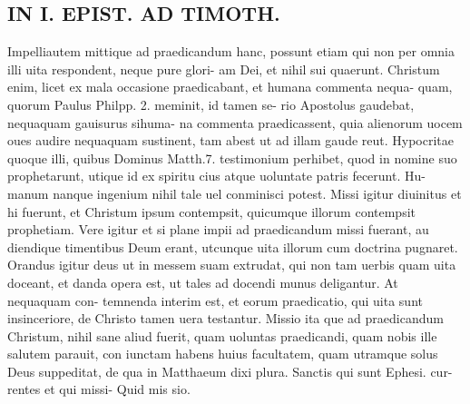 \documentclass{article}
\begin{document}
\begin{pages}
\section*{IN I. EPIST. AD TIMOTH. }\pstart Impelliautem mittique ad praedicandum hanc, possunt etiam qui non per omnia illi uita respondent, neque pure glori- am Dei, et nihil sui quaerunt. Christum enim, licet ex mala occasione praedicabant, et humana commenta nequa- quam, quorum Paulus Philpp. 2. meminit, id tamen se- rio Apostolus gaudebat, nequaquam gauisurus sihuma- na commenta praedicassent, quia alienorum uocem oues audire nequaquam sustinent, tam abest ut ad illam gaude reut. Hypocritae quoque illi, quibus Dominus Matth.7. testimonium perhibet, quod in nomine suo prophetarunt, utique id ex spiritu cius atque uoluntate patris fecerunt. Hu- manum nanque ingenium nihil tale uel conminisci potest.  Missi igitur diuinitus et hi fuerunt, et Christum ipsum contempsit, quicumque illorum contempsit prophetiam.  Vere igitur et si plane impii ad praedicandum missi fuerant, au diendique timentibus Deum erant, utcunque uita illorum cum doctrina pugnaret.   \pend\pstart Orandus igitur deus ut in messem suam extrudat, qui non tam uerbis quam uita doceant, et danda opera est, ut tales ad docendi munus deligantur. At nequaquam con- temnenda interim est, et eorum praedicatio, qui uita sunt insinceriore, de Christo tamen uera testantur.  Missio ita que ad praedicandum Christum, nihil sane aliud fuerit, quam uoluntas praedicandi, quam nobis ille salutem parauit, con iunctam habens huius facultatem, quam utramque solus Deus suppeditat, de qua in Matthaeum dixi plura.  Sanctis qui sunt Ephesi.  \pendQui cur- rentes et qui missi- Quid mis sio.  

\end{pages}
\end{document}

